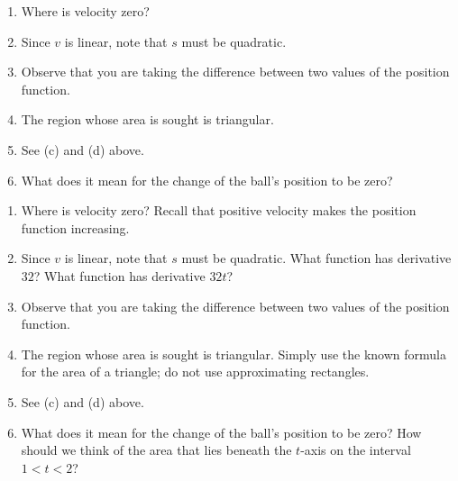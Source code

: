 \begin{smallhint}
\begin{enumerate}
	\item Where is velocity zero?
	\item Since $v$ is linear, note that $s$ must be quadratic.
	\item Observe that you are taking the difference between two values of the position function.
	\item The region whose area is sought is triangular.
	\item See (c) and (d) above.
	\item What does it mean for the change of the ball's position to be zero?
\end{enumerate}
\end{smallhint}
\begin{bighint}
\begin{enumerate}
	\item Where is velocity zero? Recall that positive velocity makes the position function increasing.
	\item Since $v$ is linear, note that $s$ must be quadratic.  What function has derivative $32$?  What function has derivative $32t$?
	\item Observe that you are taking the difference between two values of the position function.
	\item The region whose area is sought is triangular.  Simply use the known formula for the area of a triangle; do not use approximating rectangles.
	\item See (c) and (d) above.
	\item What does it mean for the change of the ball's position to be zero?  How should we think of the area that lies beneath the $t$-axis on the interval $1 < t < 2$?
\end{enumerate}
\end{bighint}
